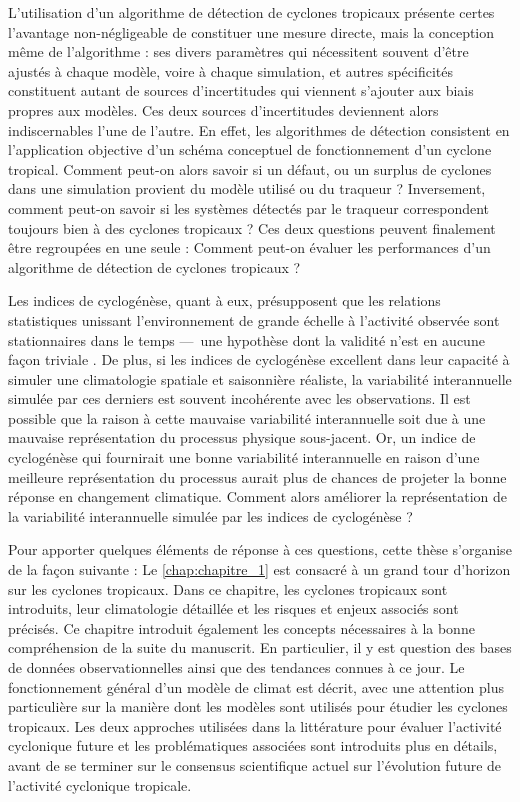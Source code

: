 \documentclass[../main.tex]{subfiles}
\begin{document}
L'utilisation d'un algorithme de détection de cyclones tropicaux présente certes l'avantage non-négligeable de constituer une mesure directe, mais la conception
même de l'algorithme : ses divers paramètres qui nécessitent souvent d'être ajustés à chaque modèle, voire à chaque simulation, et autres spécificités
constituent autant de sources d'incertitudes qui viennent s'ajouter aux biais propres aux modèles. Ces deux sources d'incertitudes deviennent alors
indiscernables l'une de l'autre. En effet, les algorithmes de détection consistent en l'application objective d'un schéma conceptuel de fonctionnement d'un
cyclone tropical. Comment peut-on alors savoir si un défaut, ou un surplus de cyclones dans une simulation provient du modèle utilisé ou du
traqueur ? Inversement, comment peut-on savoir si les systèmes détectés par le traqueur correspondent toujours bien à des cyclones tropicaux ? Ces deux
questions peuvent finalement être regroupées en une seule : Comment peut-on évaluer les performances d'un algorithme de détection de cyclones tropicaux ?

Les indices de cyclogénèse, quant à eux, présupposent que les relations statistiques unissant l'environnement de grande échelle à l'activité observée sont
stationnaires dans le temps ---~une hypothèse dont la validité n'est en aucune façon triviale \parencite{nolan_increased_2008,murakami_changes_2013}. De plus,
si les indices de cyclogénèse excellent dans leur capacité à simuler une climatologie spatiale et saisonnière réaliste, la variabilité interannuelle simulée par ces
derniers est souvent incohérente avec les observations. Il est possible que la raison à cette mauvaise variabilité interannuelle soit due à une mauvaise représentation du processus physique sous-jacent. Or, un indice de cyclogénèse qui fournirait une bonne variabilité interannuelle en raison d'une meilleure représentation du processus aurait plus de chances de projeter la bonne réponse en changement climatique. Comment alors améliorer la représentation de la variabilité interannuelle simulée par les indices de cyclogénèse ?

Pour apporter quelques éléments de réponse à ces questions, cette thèse s'organise de la façon suivante : Le \cref{chap:chapitre_1} est consacré à un grand tour
d'horizon sur les cyclones tropicaux. Dans ce chapitre, les cyclones tropicaux sont introduits, leur climatologie détaillée et les risques et enjeux associés
sont précisés. Ce chapitre introduit également les concepts nécessaires à la bonne compréhension de la suite du manuscrit. En particulier, il y est question des
bases de données observationnelles ainsi que des tendances connues à ce jour. Le fonctionnement général d'un modèle de climat est décrit, avec une attention
plus particulière sur la manière dont les modèles sont utilisés pour étudier les cyclones tropicaux. Les deux approches utilisées dans la littérature pour
évaluer l'activité cyclonique future et les problématiques associées sont introduits plus en détails, avant de se terminer sur le consensus scientifique actuel
sur l'évolution future de l'activité cyclonique tropicale.
\end{document}
